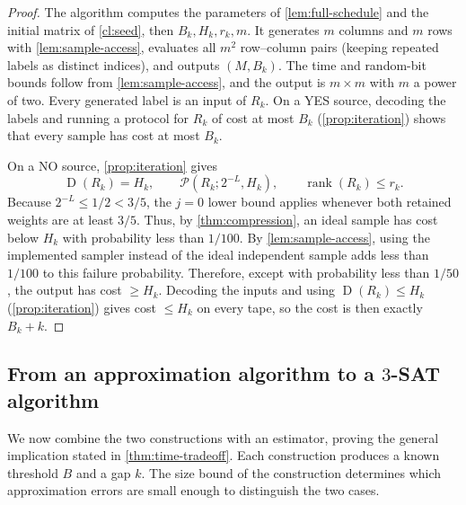 \documentclass[11pt,letterpaper]{article} \usepackage[utf8]{inputenc}
\theoremstyle{plain} \newtheorem{theorem}{Theorem}[section]
\theoremstyle{definition} \newaliascnt{definition}{theorem}
\newcommand{\D}{\operatorname{D}}
\newcommand{\RP}[3]{\mathcal{P}(#1;#2,#3)}
\DeclareMathOperator{\rank}{rank} \crefname{claim}{Claim}{Claims}
\begin{document}
\begin{proof}
The algorithm computes the parameters of \cref{lem:full-schedule} and the
initial matrix of \cref{cl:seed}, then $B_k,H_k,r_k,m$. It generates $m$ columns
and $m$ rows with \cref{lem:sample-access}, evaluates all $m^2$ row--column
pairs (keeping repeated labels as distinct indices), and outputs $(M,B_k)$.
The time and random-bit bounds follow from \cref{lem:sample-access}, and the
output is $m\times m$ with $m$ a power of two.
Every generated label is an input of $R_k$. On a YES source, decoding the
labels and running a protocol for $R_k$ of cost at most $B_k$ (\cref{prop:iteration}) shows that every sample has cost at most $B_k$.

On a NO source, \cref{prop:iteration} gives
\[
\D(R_k)=H_k,\qquad \RP{R_k}{2^{-L}}{H_k},\qquad \rank(R_k)\le r_k.
\]
Because $2^{-L}\le1/2<3/5$, the $j=0$ lower bound applies whenever both retained
weights are at least $3/5$. Thus, by \cref{thm:compression}, an ideal sample has cost below $H_k$
with probability less than $1/100$. By \cref{lem:sample-access}, using the implemented
sampler instead of the ideal independent sample adds less than $1/100$ to this
failure probability. Therefore, except with probability less than $1/50$, the
output has cost $\ge H_k$. Decoding the inputs and using $\D(R_k)\le H_k$ (\cref{prop:iteration}) gives cost $\le H_k$ on every
tape, so the cost is then exactly $B_k+k$.
\end{proof}

\subsection{From an approximation algorithm to a $3$-SAT algorithm}
\label{sec:time-tradeoff}

We now combine the two constructions with an estimator, proving the general
implication stated in \cref{thm:time-tradeoff}. Each construction produces
a known threshold $B$ and a gap $k$. The size bound of the construction determines which
approximation errors are small enough to distinguish the two cases.
\end{document}
